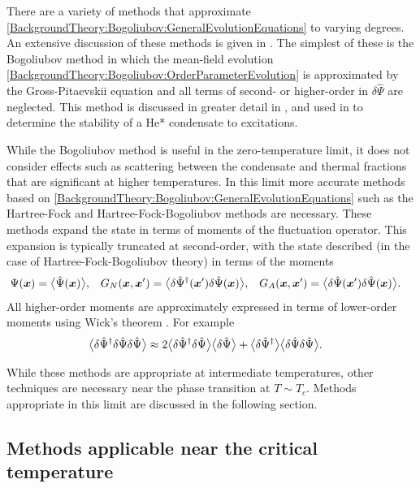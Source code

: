 There are a variety of methods that approximate \eqref{BackgroundTheory:Bogoliubov:GeneralEvolutionEquations} to varying degrees.  An extensive discussion of these methods is given in \citep{Proukakis:2008}.  The simplest of these is the Bogoliubov method in which the mean-field evolution \eqref{BackgroundTheory:Bogoliubov:OrderParameterEvolution} is approximated by the Gross-Pitaevskii equation and all terms of second- or higher-order in $\delta\hat{\Psi}$ are neglected.  This method is discussed in greater detail in , and used in  to determine the stability of a He* condensate to excitations.

While the Bogoliubov method is useful in the zero-temperature limit, it does not consider effects such as scattering between the condensate and thermal fractions that are significant at higher temperatures.  In this limit more accurate methods based on \eqref{BackgroundTheory:Bogoliubov:GeneralEvolutionEquations} such as the Hartree-Fock and Hartree-Fock-Bogoliubov methods are necessary.  These methods expand the state in terms of moments of the fluctuation operator.  This expansion is typically truncated at second-order, with the state described (in the case of Hartree-Fock-Bogoliubov theory) in terms of the moments
\begin{align*}
    \Psi(\bm{x}) &= {\big<\hat{\Psi}(\bm{x})\big>}, & G_N(\bm{x}, \bm{x}') &= {\big<\delta\hat{\Psi}^\dagger(\bm{x}') \delta\hat{\Psi}(\bm{x})\big>}, & G_A(\bm{x}, \bm{x}') &= {\big<\delta\hat{\Psi}(\bm{x}') \delta\hat{\Psi}(\bm{x})\big>}.
\end{align*}
All higher-order moments are approximately expressed in terms of lower-order moments using Wick's theorem \citep{Wick:1950,Blaizot:1986}.  For example
\begin{align}
    {\ensuremath{\big<\delta\hat{\Psi}^\dagger \delta\hat{\Psi} \delta\hat{\Psi}\big>}} &\approx 2 {\big<\delta\hat{\Psi}^\dagger \delta\hat{\Psi}\big>} {\big<\delta\hat{\Psi}\big>} + {\big<\delta\hat{\Psi}^\dagger\big>} {\big<\delta\hat{\Psi} \delta\hat{\Psi}\big>}.
\end{align}

While these methods are appropriate at intermediate temperatures, other techniques are necessary near the phase transition at $T\sim T_c$.  Methods appropriate in this limit are discussed in the following section.

\subsection{Methods applicable near the critical temperature}

